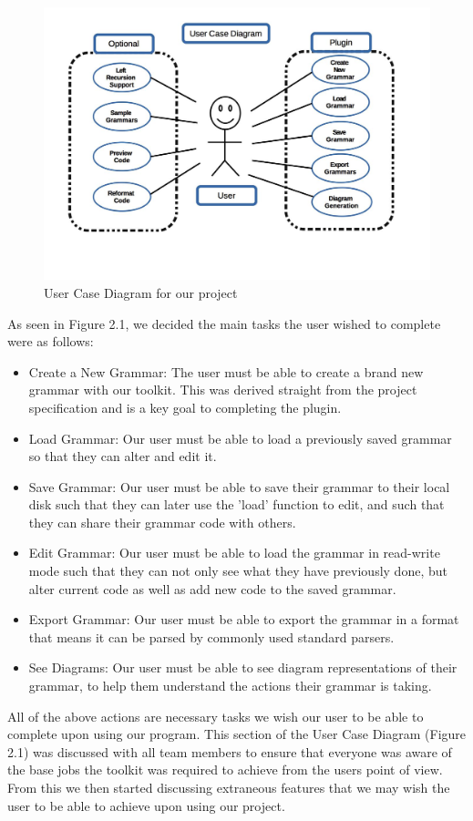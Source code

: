 \documentclass{l3proj}
\begin{document}
\begin{figure}[ht!]
\centering
\hspace*{-2.5cm}\includegraphics[width=\paperwidth]{figures/user_case_diagram.jpg}
\caption{User Case Diagram for our project \label{overflow}}
\end{figure}

As seen in Figure 2.1, we decided the main tasks the user wished to complete were as follows:
\begin {itemize}
	\item Create a New Grammar: The user must be able to create a brand new grammar with our toolkit. This was derived straight from the project specification and is a key goal to completing the plugin.
	\item Load Grammar: Our user must be able to load a previously saved grammar so that they can alter and edit it.
	\item Save Grammar: Our user must be able to save their grammar to their local disk such that they can later use the 'load' function to edit, and such that they can share their grammar code with others.
	\item Edit Grammar: Our user must be able to load the grammar in read-write mode such that they can not only see what they have previously done, but alter current code as well as add new code to the saved grammar. 
	\item Export Grammar: Our user must be able to export the grammar in a format that means it can be parsed by commonly used standard parsers.
	\item See Diagrams: Our user must be able to see diagram representations of their grammar, to help them understand the actions their grammar is taking. 
\end{itemize}
All of the above actions are necessary tasks we wish our user to be able to complete upon using our program. This section of the User Case Diagram (Figure 2.1) was discussed with all team members to ensure that everyone was aware of the base jobs the toolkit was required to achieve from the users point of view.  From this we then started discussing extraneous features that we may wish the user to be able to achieve upon using our project. 
\end{document}
